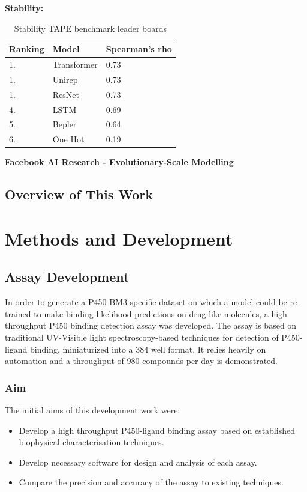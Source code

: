 \documentclass{article}
\begin{document}
\textbf{Stability:}

\begin{table}
	\begin{center}
		\caption{Stability TAPE benchmark leader boards \label{tapestab}}
		\begin{tabular}{l|p{3cm}|l}
			\textbf{Ranking} & \textbf{Model} & \textbf{Spearman's rho}\\
		\hline 
			 1. & Transformer & 0.73 \\
			 1. & Unirep & 0.73 \\
			 1. & ResNet & 0.73 \\
			 4. & LSTM & 0.69 \\
			 5. & Bepler & 0.64 \\
			 6. & One Hot & 0.19 \\
		\end{tabular}
	\end{center}
\end{table}

\textbf{Facebook AI Research - Evolutionary-Scale Modelling}

\subsection{Overview of This Work}
\section{Methods and Development}
\subsection{Assay Development}

In order to generate a P450 BM3-specific dataset on which a model could be re-trained to make binding likelihood predictions on drug-like molecules, a high throughput P450 binding detection assay was developed.
The assay is based on traditional UV-Visible light spectroscopy-based techniques for detection of P450-ligand binding, miniaturized into a 384 well format. 
It relies heavily on automation and a throughput of 980 compounds per day is demonstrated.

\subsubsection{Aim}

The initial aims of this development work were:

\begin{itemize}
	\item Develop a high throughput P450-ligand binding assay based on established biophysical characterisation techniques.
	\item Develop necessary software for design and analysis of each assay.
	\item Compare the precision and accuracy of the assay to existing techniques.
\end{itemize}
\end{document}
